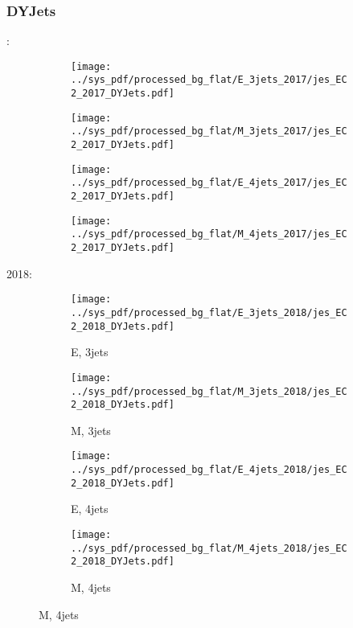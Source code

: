 \documentclass{beamer}
\begin{document}
\begin{frame}
\frametitle{DYJets}
\fontsize{5}{1}:
\begin{figure}
\centering
\begin{subfigure}[b]{0.24\textwidth}
\texttt{[image: ../sys\_pdf/processed\_bg\_flat/E\_3jets\_2017/jes\_EC2\_2017\_DYJets.pdf]}
\end{subfigure}
\begin{subfigure}[b]{0.24\textwidth}
\texttt{[image: ../sys\_pdf/processed\_bg\_flat/M\_3jets\_2017/jes\_EC2\_2017\_DYJets.pdf]}
\end{subfigure}
\begin{subfigure}[b]{0.24\textwidth}
\texttt{[image: ../sys\_pdf/processed\_bg\_flat/E\_4jets\_2017/jes\_EC2\_2017\_DYJets.pdf]}
\end{subfigure}
\begin{subfigure}[b]{0.24\textwidth}
\texttt{[image: ../sys\_pdf/processed\_bg\_flat/M\_4jets\_2017/jes\_EC2\_2017\_DYJets.pdf]}
\end{subfigure}
\end{figure}
2018:
\begin{figure}
\centering
\begin{subfigure}[b]{0.24\textwidth}
\texttt{[image: ../sys\_pdf/processed\_bg\_flat/E\_3jets\_2018/jes\_EC2\_2018\_DYJets.pdf]}
\captionsetup{font=tiny}
\caption{E, 3jets}
\end{subfigure}
\begin{subfigure}[b]{0.24\textwidth}
\texttt{[image: ../sys\_pdf/processed\_bg\_flat/M\_3jets\_2018/jes\_EC2\_2018\_DYJets.pdf]}
\captionsetup{font=tiny}
\caption{M, 3jets}
\end{subfigure}
\begin{subfigure}[b]{0.24\textwidth}
\texttt{[image: ../sys\_pdf/processed\_bg\_flat/E\_4jets\_2018/jes\_EC2\_2018\_DYJets.pdf]}
\captionsetup{font=tiny}
\caption{E, 4jets}
\end{subfigure}
\begin{subfigure}[b]{0.24\textwidth}
\texttt{[image: ../sys\_pdf/processed\_bg\_flat/M\_4jets\_2018/jes\_EC2\_2018\_DYJets.pdf]}
\captionsetup{font=tiny}
\caption{M, 4jets}
\end{subfigure}
\end{figure}
\end{frame}
\end{document}
